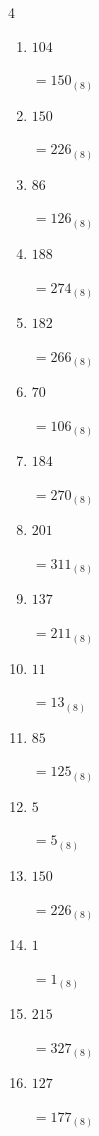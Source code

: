 \begin{multicols}{4}
\begin{enumerate}
  \item $104$

        $=150_{(8)}$

  \item $150$

        $=226_{(8)}$

  \item $86$

        $=126_{(8)}$

  \item $188$

        $=274_{(8)}$

  \item $182$

        $=266_{(8)}$

  \item $70$

        $=106_{(8)}$

  \item $184$

        $=270_{(8)}$

  \item $201$

        $=311_{(8)}$

  \item $137$

        $=211_{(8)}$

  \item $11$

        $=13_{(8)}$

  \item $85$

        $=125_{(8)}$

  \item $5$

        $=5_{(8)}$

\columnbreak %

\resetques

  \item $150$

        $=226_{(8)}$

  \item $1$

        $=1_{(8)}$

  \item $215$

        $=327_{(8)}$

  \item $127$

        $=177_{(8)}$


\end{enumerate}
\end{multicols}
